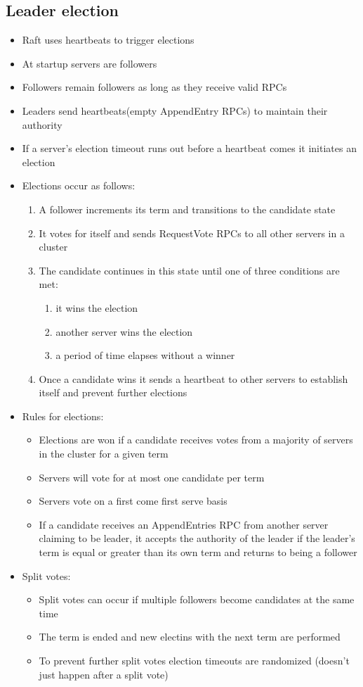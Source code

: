 \documentclass[10pt,a4paper]{article}
\begin{document}
	\subsection{Leader election}
	\begin{itemize}
		\item Raft uses heartbeats to trigger elections
		\item At startup servers are followers
		\item Followers remain followers as long as they receive valid RPCs
		\item Leaders send heartbeats(empty AppendEntry RPCs) to maintain their authority
		\item If a server's election timeout runs out before a heartbeat comes it initiates an election
		\item Elections occur as follows:
		\begin{enumerate}
			\item A follower increments its term and transitions to the candidate state
			\item It votes for itself and sends RequestVote RPCs to all other servers in a cluster
			\item The candidate continues in this state until one of three conditions are met:
			\begin{enumerate}
				\item it wins the election
				\item another server wins the election
				\item a period of time elapses without a winner
			\end{enumerate}
			\item Once a candidate wins it sends a heartbeat to other servers to establish itself and prevent further elections
		\end{enumerate}
		\item Rules for elections:
		\begin{itemize}
			\item Elections are won if a candidate receives votes from a majority of servers in the cluster for a given term
			\item Servers will vote for at most one candidate per term
			\item Servers vote on a first come first serve basis
			\item If a candidate receives an AppendEntries RPC from another server claiming to be leader, it accepts the authority of the leader if the leader's term is equal or greater than its own term and returns to being a follower
		\end{itemize}
		\item Split votes:
		\begin{itemize}
			\item Split votes can occur if multiple followers become candidates at the same time
			\item The term is ended and new electins with the next term are performed
			\item To prevent further split votes election timeouts are randomized (doesn't just happen after a split vote)
		\end{itemize}
	\end{itemize}
\end{document}
